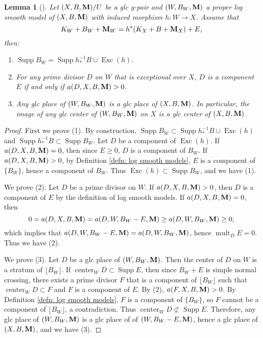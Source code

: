 \documentclass[11pt]{amsart}
\numberwithin{equation}{section}
\newcommand{\Mm}{{\bf{M}}}
\newcommand{\Center}{\operatorname{center}}
\newcommand{\Exc}{\operatorname{Exc}}
\newcommand{\Supp}{\operatorname{Supp}}
\newcommand{\mult}{\operatorname{mult}}
\newtheorem{lem}[thm]{Lemma}
\theoremstyle{definition}
\theoremstyle{definition}
\theoremstyle{definition}
\begin{document}
\begin{lem}[{\cite[Version 3, Lemma 3.7]{HL21}}]\label{lem: proper log smooth model keep lc center}
Let $(X,B,\Mm)/U$ be a glc g-pair and $(W,B_W,\Mm)$ a proper log smooth model of $(X,B,\Mm)$ with induced morphism $h: W\rightarrow X$. Assume that
$$K_W+B_W+\Mm_W=h^*(K_X+B+\Mm_X)+E,$$
then:
\begin{enumerate}
    \item $\Supp B_W=\Supp h^{-1}_*B\cup\Exc(h)$.
    \item For any prime divisor $D$ on $W$ that is exceptional over $X$, $D$ is a component $E$ if and only if $a(D,X,B,\Mm)>0$.
    \item Any glc place of $(W,B_W,\Mm)$ is a glc place of $(X,B,\Mm)$. In particular, the image of any glc center of $(W,B_W,\Mm)$ on $X$ is a glc center of $(X,B,\Mm)$.
\end{enumerate}
\end{lem}
\begin{proof}
First we prove (1). By construction, $\Supp B_W\subset\Supp h^{-1}_*B\cup\Exc(h)$ and $\Supp h^{-1}_*B\subset\Supp B_W$. Let $D$ be a component of $\Exc(h)$. If $a(D,X,B,\Mm)=0$, then since $E\geq 0$, $D$ is a component of $B_W$. If $a(D,X,B,\Mm)>0$, by Definition \ref{defn: log smooth models}, $E$ is a component of $\{B_W\}$, hence a component of $B_W$. Thus $\Exc(h)\subset\Supp B_W$, and we have (1).

We prove (2). Let $D$ be a prime divisor on $W$. If $a(D,X,B,\Mm)>0$, then $D$ is a component of $E$ by the definition of log smooth models. If $a(D,X,B,\Mm)=0$, then
$$0=a(D,X,B,\Mm)=a(D,W,B_W-E,\Mm)\geq a(D,W,B_W,\Mm)\geq 0,$$
which implies that $a(D,W,B_W-E,\Mm)=a(D,W,B_W,\Mm)$, hence $\mult_DE=0$. Thus we have (2).

We prove (3). Let $D$ be a glc place of $(W,B_W,\Mm)$. Then the center of $D$ on $W$ is a stratum of $\lfloor B_W\rfloor$. If $\Center_WD\subset\Supp E$, then since $B_W+E$ is simple normal crossing, there exists a prime divisor $F$ that is a component of $\lfloor B_W\rfloor$ such that $\Center_WD\subset F$ and $F$ is a component of $E$. By (2), $a(F,X,B,\Mm)>0$. By Definition \ref{defn: log smooth models}, $F$ is a component of $\{B_W\}$, so $F$ cannot be a component of $\lfloor B_W\rfloor$, a contradiction. Thus $\Center_WD\not\subset\Supp E$. Therefore, any glc place of $(W,B_W,\Mm)$ is a glc place of  of $(W,B_W-E,\Mm)$, hence a glc place of $(X,B,\Mm)$, and we have (3).
\end{proof}
\end{document}
